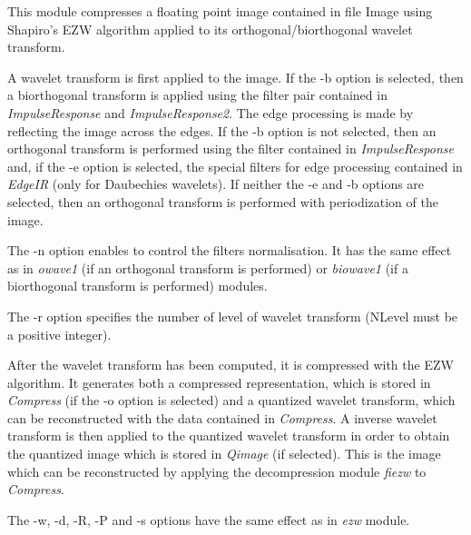 This module compresses a floating point image contained in file Image using 
Shapiro's EZW algorithm applied to its orthogonal/biorthogonal wavelet 
transform. 

A wavelet transform is first applied to the image. If the -b option is 
selected, then a biorthogonal transform is applied using the filter pair 
contained in {\em ImpulseResponse} and {\em ImpulseResponse2}. 
The edge processing is made by reflecting the image across the edges. 
If the -b option is not selected, then an orthogonal transform 
is performed using the filter contained in {\em ImpulseResponse} and, 
if the -e option is selected, the special filters for edge processing 
contained in {\em EdgeIR} (only for Daubechies wavelets). 
If neither the -e and -b options are selected, then an orthogonal transform 
is performed with periodization of the image. 

The -n option enables to control the filters normalisation. It has the same 
effect as in {\em owave1} (if an orthogonal transform is performed) or 
{\em biowave1} (if a biorthogonal transform is performed) modules.

The -r option specifies the number of level of wavelet transform (NLevel 
must be a positive integer). 

After the wavelet transform has been computed, it is compressed 
with the EZW algorithm. It generates both a compressed representation, 
which is stored in {\em Compress} (if the -o option is selected) and 
a quantized wavelet transform, which can be reconstructed with 
the data contained in {\em Compress}. A inverse wavelet transform is then 
applied to the quantized wavelet transform in order to obtain the quantized 
image which is stored in {\em Qimage} (if selected). This is the image 
which can be reconstructed by applying the decompression module {\em fiezw} 
to {\em Compress}. 

The -w, -d, -R, -P and -s options have the same effect 
as in {\em ezw} module.  


